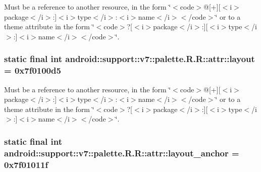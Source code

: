Must be a reference to another resource, in the form \char`\"{}$<$code$>$@\mbox{[}+\mbox{]}\mbox{[}$<$i$>$package$<$/i$>$:\mbox{]}$<$i$>$type$<$/i$>$:$<$i$>$name$<$/i$>$$<$/code$>$\char`\"{} or to a theme attribute in the form \char`\"{}$<$code$>$?\mbox{[}$<$i$>$package$<$/i$>$:\mbox{]}\mbox{[}$<$i$>$type$<$/i$>$:\mbox{]}$<$i$>$name$<$/i$>$$<$/code$>$\char`\"{}. \hypertarget{classandroid_1_1support_1_1v7_1_1palette_1_1_r_1_1attr_f564eb3543ef83560a7f0659d18217b7}{
\subsubsection[{layout}]{\setlength{\rightskip}{0pt plus 5cm}static final int android::support::v7::palette.R.R::attr::layout = 0x7f0100d5}}
\label{classandroid_1_1support_1_1v7_1_1palette_1_1_r_1_1attr_f564eb3543ef83560a7f0659d18217b7}


Must be a reference to another resource, in the form \char`\"{}$<$code$>$@\mbox{[}+\mbox{]}\mbox{[}$<$i$>$package$<$/i$>$:\mbox{]}$<$i$>$type$<$/i$>$:$<$i$>$name$<$/i$>$$<$/code$>$\char`\"{} or to a theme attribute in the form \char`\"{}$<$code$>$?\mbox{[}$<$i$>$package$<$/i$>$:\mbox{]}\mbox{[}$<$i$>$type$<$/i$>$:\mbox{]}$<$i$>$name$<$/i$>$$<$/code$>$\char`\"{}. \hypertarget{classandroid_1_1support_1_1v7_1_1palette_1_1_r_1_1attr_c665825ee3ab1514e43965a9fcb05153}{
\subsubsection[{layout\_\-anchor}]{\setlength{\rightskip}{0pt plus 5cm}static final int android::support::v7::palette.R.R::attr::layout\_\-anchor = 0x7f01011f}}
\label{classandroid_1_1support_1_1v7_1_1palette_1_1_r_1_1attr_c665825ee3ab1514e43965a9fcb05153}


